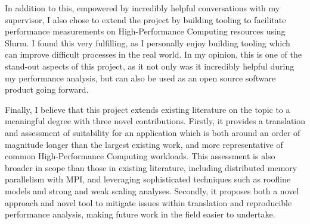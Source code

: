 

In addition to this, empowered by incredibly helpful conversations with my supervisor, I also chose to extend the project by building tooling to facilitate performance measurements on High-Performance Computing resources using Slurm. I found this very fulfilling, as I personally enjoy building tooling which can improve difficult processes in the real world. In my opinion, this is one of the stand-out aspects of this project, as it not only was it incredibly helpful during my performance analysis, but can also be used as an open source software product going forward.

Finally, I believe that this project extends existing literature on the topic to a meaningful degree with three novel contributions. Firstly, it provides a translation and assessment of suitability for an application which is both around an order of magnitude longer than the largest existing work, and more representative of common High-Performance Computing workloads. This assessment is also broader in scope than those in existing literature, including distributed memory parallelism with MPI, and leveraging sophisticated techniques such as roofline models and strong and weak scaling analyses. Secondly, it proposes both a novel approach and novel tool to mitigate issues within translation and reproducible performance analysis, making future work in the field easier to undertake.


